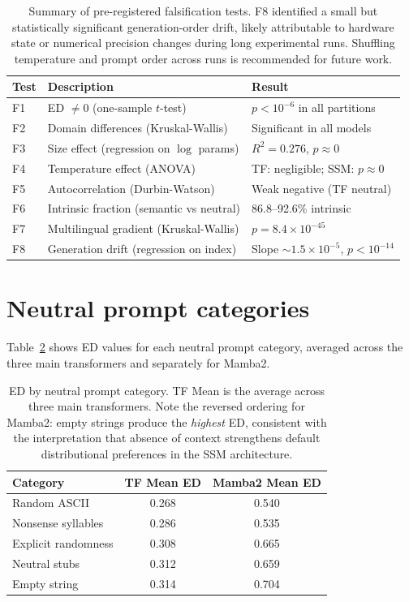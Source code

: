 \documentclass{article}
\begin{document}
\begin{table}[H]
\centering
\small
\begin{tabular}{lll}
\toprule
\textbf{Test} & \textbf{Description} & \textbf{Result} \\
\midrule
F1 & ED $\neq 0$ (one-sample $t$-test) & $p < 10^{-6}$ in all partitions \\
F2 & Domain differences (Kruskal-Wallis) & Significant in all models \\
F3 & Size effect (regression on $\log$ params) & $R^2 = 0.276$, $p \approx 0$ \\
F4 & Temperature effect (ANOVA) & TF: negligible; SSM: $p \approx 0$ \\
F5 & Autocorrelation (Durbin-Watson) & Weak negative (TF neutral) \\
F6 & Intrinsic fraction (semantic vs neutral) & 86.8--92.6\% intrinsic \\
F7 & Multilingual gradient (Kruskal-Wallis) & $p = 8.4 \times 10^{-45}$ \\
F8 & Generation drift (regression on index) & Slope $\sim 1.5 \times 10^{-5}$, $p < 10^{-14}$ \\
\bottomrule
\end{tabular}
\caption{Summary of pre-registered falsification tests. F8 identified a small but statistically significant generation-order drift, likely attributable to hardware state or numerical precision changes during long experimental runs. Shuffling temperature and prompt order across runs is recommended for future work.}
\label{tab:falsification}
\end{table}

\section{Neutral prompt categories}
\label{app:neutral}

Table~\ref{tab:neutral} shows ED values for each neutral prompt category, averaged across the three main transformers and separately for Mamba2.

\begin{table}[H]
\centering
\small
\begin{tabular}{lcc}
\toprule
\textbf{Category} & \textbf{TF Mean ED} & \textbf{Mamba2 Mean ED} \\
\midrule
Random ASCII & 0.268 & 0.540 \\
Nonsense syllables & 0.286 & 0.535 \\
Explicit randomness & 0.308 & 0.665 \\
Neutral stubs & 0.312 & 0.659 \\
Empty string & 0.314 & 0.704 \\
\bottomrule
\end{tabular}
\caption{ED by neutral prompt category. TF Mean is the average across three main transformers. Note the reversed ordering for Mamba2: empty strings produce the \emph{highest} ED, consistent with the interpretation that absence of context strengthens default distributional preferences in the SSM architecture.}
\label{tab:neutral}
\end{table}
\end{document}
